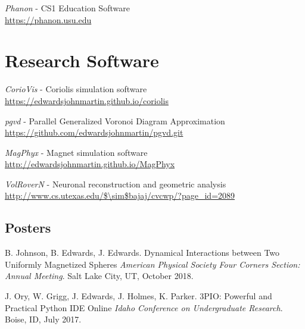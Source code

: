 \documentclass[margin,line]{res}
\begin{document}
\begin{resume}
\emph{Phanon} - CS1 Education Software\\
\url{https://phanon.usu.edu}

\section{\sc Research Software}

\emph{CorioVis} - Coriolis simulation software\\
\url{https://edwardsjohnmartin.github.io/coriolis}

\emph{pgvd} - Parallel Generalized Voronoi Diagram Approximation\\
\url{https://github.com/edwardsjohnmartin/pgvd.git}


\emph{MagPhyx} - Magnet simulation software\\
\url{http://edwardsjohnmartin.github.io/MagPhyx}


\emph{VolRoverN} - Neuronal reconstruction and geometric analysis\\
\url{http://www.cs.utexas.edu/$\sim$bajaj/cvcwp/?page\_id=2089}


\begin{LONG}

\section{\sc Posters}
B. Johnson, B. Edwards, J. Edwards.
Dynamical Interactions between Two Uniformly Magnetized Spheres
\textit{American Physical Society Four Corners Section: Annual Meeting}. Salt Lake City, UT, October 2018.

J. Ory, W. Grigg, J. Edwards, J. Holmes, K. Parker.
3PIO: Powerful and Practical Python IDE Online
\textit{Idaho Conference on Undergraduate Research}. Boise, ID, July 2017.


\end{LONG}
\end{resume}
\end{document}
